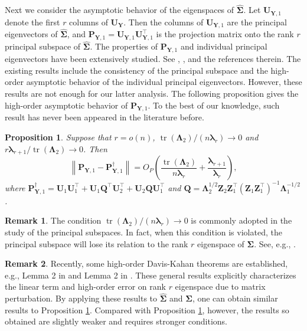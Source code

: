 \documentclass[12pt]{article} %
\DeclareMathOperator{\mytr}{tr}
\newcommand{\bQ}{\mathbf{Q}}
\newcommand{\bZ}{\mathbf{Z}}
\newcommand{\bP}{\mathbf{P}}
\newcommand{\bY}{\mathbf{Y}}
\newcommand{\bU}{\mathbf{U}}
\newcommand{\bfsym}[1]{\ensuremath{\boldsymbol{#1}}}
\def\blambda {\bfsym {\lambda}}
\def\bLambda {\bfsym {\Lambda}}
\def\bSigma {\bfsym {\Sigma}}
\newtheorem{proposition}{Proposition}
\theoremstyle{definition}
\newtheorem{remark}{Remark}
\begin{document}
Next we consider the asymptotic behavior of the eigenspaces of $\hat{\bSigma}$.
Let $\bU_{\bY,1}$ denote the first $r$ columns of $\bU_{\bY}$.
Then the columns of $\bU_{\bY,1}$ are the principal eigenvectors of $\hat{\bSigma}$, and $\bP_{\bY,1}=\bU_{\bY,1}\bU_{\bY,1}^\top$ is the projection matrix onto the rank $r$ principal subspace of $\hat{\bSigma}$.
The properties of $\bP_{\bY,1}$ and individual principal eigenvectors have been extensively studied.
See \cite{Cai2015Optimal}, \cite{Shen2016A}, \cite{wang2017As} and the references therein.
The existing results include the consistency of the principal subspace and the high-order asymptotic behavior of the individual principal eigenvectors.
However, these results are not enough for our latter analysis.
The following proposition gives the high-order asymptotic behavior of $\bP_{\bY,1}$.
To the best of our knowledge, such result has never been appeared in the literature before.



\begin{proposition}\label{newEigenvectorPropCor}
    Suppose that $r=o(n)$, $\mytr(\bLambda_2)/(n\blambda_r)\to 0$ and $r \blambda_{r+1}/\mytr(\bLambda_2)\to 0$. Then
    \begin{equation*}
        \left\|\bP_{\bY,1} - 
        \bP_{\bY,1}^{\dagger}\right\|
        =O_P\left(\frac{\mytr(\bLambda_2)}{n\blambda_r}+\frac{\blambda_{r+1}}{\blambda_r}\right),
    \end{equation*}
where
$
\bP_{\bY,1}^{\dagger}
=\bU_1 \bU_1^\top + \bU_1 \bQ^\top \bU_2^\top
            +\bU_2 \bQ \bU_1^\top
            $ and 
$\bQ
       =
       \bLambda_2^{1/2} \bZ_2 \bZ_1^\top (\bZ_1 \bZ_1^\top)^{-1} \bLambda_1^{-1/2}
       $.
\end{proposition}
\begin{remark}
    The condition $\mytr(\bLambda_2)/(n\blambda_r)\to 0$ is commonly adopted in the study of the principal subspaces.
    In fact, when this condition is violated, the principal subspace will lose its relation to the rank $r$ eigenspace of $\bSigma$. See, e.g., \cite{Nadler2009Finite}.
\end{remark}
\begin{remark}
    Recently, some high-order Davis-Kahan theorems are established, e.g., Lemma 2 in \cite{koltchinskii2016} and Lemma 2 in \cite{fan2017Dist}.
    These general results explicitly characterizes the linear term and high-order error on rank $r$ eigenspace due to matrix perturbation.
    By applying these results to $\hat{\bSigma}$ and $\bSigma$, one can obtain similar results to Proposition \ref{newEigenvectorPropCor}.
    Compared with Proposition \ref{newEigenvectorPropCor},
    however, the results so obtained are slightly weaker and requires stronger conditions. 
\end{remark}
\end{document}
